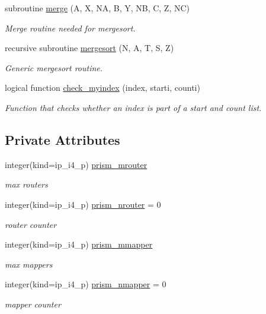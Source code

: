 \begin{DoxyCompactItemize}
subroutine \hyperlink{classmod__oasis__coupler_aaef001fff7e7f3cb23eb913433efcb87}{merge} (A, X, N\+A, B, Y, N\+B, C, Z, N\+C)
\begin{DoxyCompactList}\small\item\em Merge routine needed for mergesort. \end{DoxyCompactList}\item 
recursive subroutine \hyperlink{classmod__oasis__coupler_a31a0d796e69ec189baf149ad806f97c6}{mergesort} (N, A, T, S, Z)
\begin{DoxyCompactList}\small\item\em Generic mergesort routine. \end{DoxyCompactList}\item 
logical function \hyperlink{classmod__oasis__coupler_a72bc8786dd0286883ad5147502684bed}{check\+\_\+myindex} (index, starti, counti)
\begin{DoxyCompactList}\small\item\em Function that checks whether an index is part of a start and count list. \end{DoxyCompactList}\end{DoxyCompactItemize}
\subsection*{Private Attributes}
\begin{DoxyCompactItemize}
\item 
integer(kind=ip\+\_\+i4\+\_\+p) \hyperlink{classmod__oasis__coupler_a6d46883e9df70ab9cdafaf607afacacb}{prism\+\_\+mrouter}
\begin{DoxyCompactList}\small\item\em max routers \end{DoxyCompactList}\item 
integer(kind=ip\+\_\+i4\+\_\+p) \hyperlink{classmod__oasis__coupler_a2ebdb255598e1b004de2533f16b06e04}{prism\+\_\+nrouter} = 0
\begin{DoxyCompactList}\small\item\em router counter \end{DoxyCompactList}\item 
integer(kind=ip\+\_\+i4\+\_\+p) \hyperlink{classmod__oasis__coupler_a3e879d9a711d847bf5079752100405e8}{prism\+\_\+mmapper}
\begin{DoxyCompactList}\small\item\em max mappers \end{DoxyCompactList}\item 
integer(kind=ip\+\_\+i4\+\_\+p) \hyperlink{classmod__oasis__coupler_afc07469eb6600d0bef40148e61c0f336}{prism\+\_\+nmapper} = 0
\begin{DoxyCompactList}\small\item\em mapper counter \end{DoxyCompactList}\end{DoxyCompactItemize}


